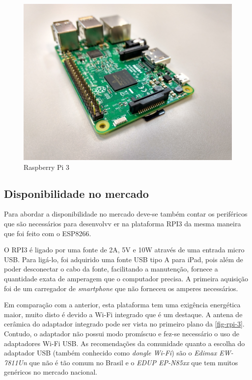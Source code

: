 \begin{figure}[htb]
	\caption{\label{fig-rpi-3}Raspberry Pi 3 }
	\begin{center}
		\includegraphics[width=1\textwidth]{040-plataformas/RPi-WiFi-dongles/rpi-onboard.jpg}
	\end{center}
\end{figure}



\subsection{Disponibilidade no mercado}
\label{subsec:mercado-rpi}

Para abordar a disponibilidade no mercado deve-se também contar os periféricos
que são necessários para desenvolvv er na plataforma  RPI3 da mesma maneira que
foi feito com o ESP8266.

O RPI3 é ligado por uma fonte de 2A, 5V e 10W através de uma entrada micro
USB. Para ligá-lo, foi adquirido uma fonte USB tipo A para iPad, pois além de
poder desconectar o cabo da fonte, facilitando a manutenção, fornece a
quantidade exata de amperagem que o computador precisa. A primeira aquisição foi
de um carregador de \emph{smartphone} que não forneceu os amperes necessários.

Em comparação com a anterior, esta plataforma tem uma exigência energética maior,
muito disto é devido a Wi-Fi integrado que é um destaque.
A antena de cerâmica do adaptador integrado pode ser vista no primeiro plano da
\autoref{fig-rpi-3}. Contudo, o adaptador não possui modo promíscuo e fez-se
necessário o uso de adaptadores Wi-Fi USB. As recomendações da comunidade
quanto a escolha do adaptador USB (também conhecido como \emph{dongle Wi-Fi})
são o \emph{Edimax EW-7811Un} que não é tão comum no Brasil e o
\emph{EDUP EP-N85xx} que tem muitos genéricos no mercado nacional.

